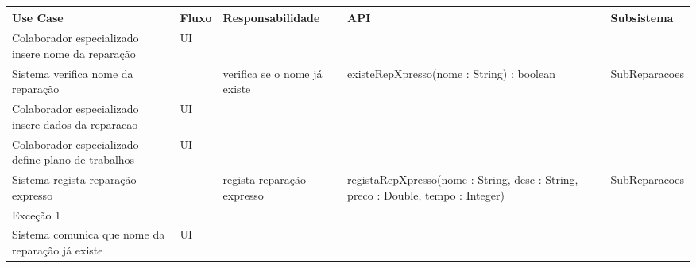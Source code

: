 \documentclass[../relatorio.tex]{subfiles}
\begin{document}
\begin{landscape}
    \begin{table}[!h]
        \centering
        \begin{tabular}{|p{5cm}|p{1cm}|p{4cm}|p{6cm}|p{3cm}|}
            \hline
            \rowcolor{gray!20!white}
            Use Case & Fluxo                                            & Responsabilidade & API & Subsistema \\
            \hline
            \rowcolor{yellow}
            Colaborador especializado insere nome da reparação
                     & UI
                     & 
                     & 
                     & 
            \\
            \hline
            Sistema verifica nome da reparação
                     & 
                     & verifica se o nome já existe
                     & existeRepXpresso(nome : String) : boolean
                     & SubReparacoes
            \\
            \hline
            \rowcolor{yellow}
            Colaborador especializado insere dados da reparacao
                     & UI
                     & 
                     & 
                     & 
            \\
            \hline
            Colaborador especializado define plano de trabalhos
                     & UI
                     & 
                     & 
                     & 
            \\
            \hline
            Sistema regista reparação expresso
                     & 
                     & regista reparação expresso
                     & registaRepXpresso(nome : String, desc : String, preco : Double, tempo : Integer)
                     & SubReparacoes
            \\
            \hline
            \rowcolor{red!30}
            Exceção 1 &                                                  &                  &     &            \\
            \hline
            Sistema comunica que nome da reparação já existe
                     & UI
                     & 
                     & 
                     & 
            \\
            \hline
        \end{tabular}
    \end{table}
\end{landscape}
\end{document}
